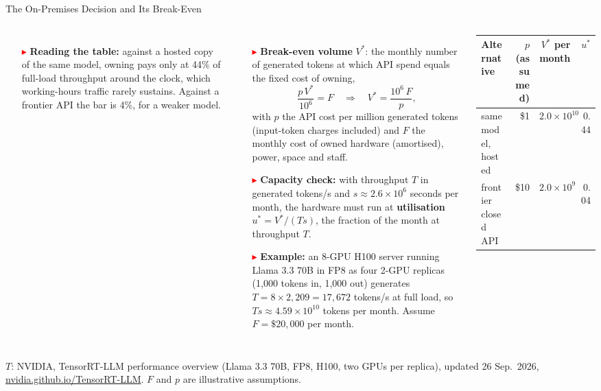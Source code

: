 \begin{frame}{The On-Premises Decision and Its Break-Even}
\begin{columns}[T,onlytextwidth]
\begin{itemize}
        \item[\textcolor{red}{$\blacktriangleright$}] \textbf{Reading the table:} against a hosted copy of the same model, owning pays only at 44\% of full-load throughput around the clock, which working-hours traffic rarely sustains. Against a frontier API the bar is 4\%, for a weaker model.
      \end{itemize}
      \begin{itemize}\scriptsize\itemsep0.2em
        \item[\textcolor{red}{$\blacktriangleright$}] \textbf{Break-even volume} $V^{*}$: the monthly number of generated tokens at which API spend equals the fixed cost of owning,
          \[ \frac{p\,V^{*}}{10^{6}} = F \quad\Longrightarrow\quad V^{*} = \frac{10^{6}\,F}{p}, \]
          with $p$ the API cost per million generated tokens (input-token charges included) and $F$ the monthly cost of owned hardware (amortised), power, space and staff.
        \item[\textcolor{red}{$\blacktriangleright$}] \textbf{Capacity check:} with throughput $T$ in generated tokens/s and $s \approx 2.6\times10^{6}$ seconds per month, the hardware must run at \textbf{utilisation} $u^{*} = V^{*}/(T s)$, the fraction of the month at throughput $T$.
        \item[\textcolor{red}{$\blacktriangleright$}] \textbf{Example:} an 8-GPU H100 server running Llama 3.3 70B in FP8 as four 2-GPU replicas (1,000 tokens in, 1,000 out) generates $T = 8 \times 2{,}209 = 17{,}672$ tokens/s at full load, so $T s \approx 4.59\times10^{10}$ tokens per month. Assume $F = \$20{,}000$ per month.
      \end{itemize}
      {\centering\scriptsize\setlength{\tabcolsep}{3pt}
      \begin{tabular}{l r r r}
        \toprule
        \textbf{Alternative} & $p$ (assumed) & $V^{*}$ per month & $u^{*}$ \\
        \midrule
        same model, hosted & \$1 & $2.0\times10^{10}$ & 0.44 \\
        frontier closed API & \$10 & $2.0\times10^{9}$ & 0.04 \\
        \bottomrule
      \end{tabular}\par}
  \end{columns}
  \vspace{0.2em}
  {\scriptsize $T$: NVIDIA, TensorRT-LLM performance overview (Llama 3.3 70B, FP8, H100, two GPUs per replica), updated 26 Sep.\ 2026, \href{https://nvidia.github.io/TensorRT-LLM/developer-guide/perf-overview.html}{nvidia.github.io/TensorRT-LLM}. $F$ and $p$ are illustrative assumptions.\par}
\end{frame}

